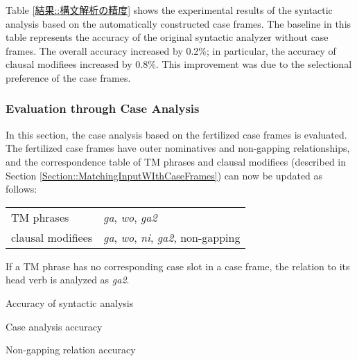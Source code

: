 \documentclass[english]{jnlp_1.4_rep}
\begin{document}
Table \ref{結果::構文解析の精度} shows the experimental results of the
syntactic analysis based on the automatically constructed case frames.
The baseline in this table represents the accuracy of the original
syntactic analyzer without case frames. The overall accuracy increased
by 0.2\%; in particular, the accuracy of clausal modifiees increased
by 0.8\%. This improvement was due to the selectional preference of the
case frames.


\subsubsection*{Evaluation through Case Analysis}

In this section, the case analysis based on the fertilized case frames
is evaluated. The fertilized case frames have outer nominatives and
non-gapping relationships, and the correspondence table of TM phrases and
clausal modifiees (described in Section
\ref{Section::MatchingInputWIthCaseFrames}) can now be updated as follows:

\vspace{1\Cvs}
\begin{center}
\begin{tabular}{l@{ : }l}
\hline
  TM phrases & \textit{ga}, \textit{wo}, \textit{ga2} \\
  clausal modifiees & \textit{ga}, \textit{wo}, \textit{ni}, \textit{ga2}, non-gapping \\
\hline
\end{tabular}
\end{center}
\vspace{1\Cvs}

\noindent
If a TM phrase has no corresponding case slot in a case frame, the
relation to its head verb is analyzed as \textit{ga2}.

\begin{table}[b]
  \caption{Accuracy of syntactic analysis}
  \label{結果::構文解析の精度}

\end{table}

\begin{table}[b]
  \caption{Case analysis accuracy}
  \label{Result::CaseAnalysisAccuracy}

\end{table}
\begin{table}[b]
  \caption{Non-gapping relation accuracy}
  \label{Result::Non-GappingRelationAccuracy}

\end{table}
\end{document}
